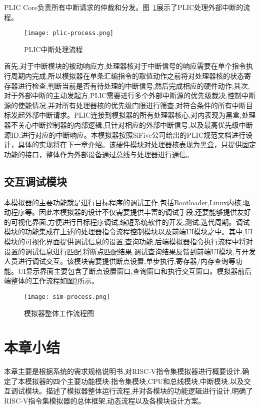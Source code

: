 PLIC Core负责所有中断请求的仲裁和分发。图~\ref{fig:plic-process}展示了PLIC处理外部中断的流程。
\begin{figure}[h]
    \centering
    \texttt{[image: plic-process.png]}
    \caption{PLIC中断处理流程}
    \label{fig:plic-process}
\end{figure}

首先,对于中断模块的被动响应方,处理器核对于中断信号的响应需要在单个指令执行周期内完成,所以模拟器在单条汇编指令的取值动作之前将对处理器核的状态寄存器进行检查,判断当前是否有待处理的中断信号,然后完成相应的硬件动作;其次,对于外部中断的主动发起方,PLIC需要进行多个外部中断源的优先级裁决,控制中断源的使能情况,并对所有处理器核的优先级门限进行筛查,对符合条件的所有中断目标发起外部中断请求。PLIC连接到模拟器的所有处理器核心,对内表现为黑盒,处理器不关心中断控制器的内部逻辑,只针对相应的外部中断信号,以及最高优先级中断源ID,进行对应的中断响应。本模拟器按照SiFive公司给出的PLIC规范文档进行设计，具体的实现将在下一章介绍。该硬件模块对处理器核表现为黑盒，只提供固定功能的接口，整体作为外部设备通过总线与处理器进行通信。

\subsection{交互调试模块}
本模拟器的主要功能就是进行目标程序的调试工作,包括Bootloader,Linux内核,驱动程序等。因此本模拟器的设计不仅需要提供丰富的调试手段,还要能够提供友好的可视化界面,方便进行目标程序调试,缩短系统软件的开发,测试,迭代周期。调试模块的功能集成在上述的处理器指令流程控制模块以及前端UI模块之中。其中,UI模块的可视化界面提供调试信息的设置,查询功能,后端模拟器指令执行流程中将对设置的调试信息进行匹配,将断点匹配结果,调试查询结果反馈到前端UI模块,与开发人员进行调试交互。该模块需要提供断点设置,单步执行,寄存器/内存查询等功能。UI显示界面主要包含了断点设置窗口,查询窗口和执行交互窗口。模拟器前后端整体的工作流程如图\ref{fig:work-frame}所示。
\begin{figure}[H]
  \centering
  \texttt{[image: sim-process.png]}
  \caption{模拟器整体工作流程图}
  \label{fig:work-frame}
\end{figure}

\section{本章小结}
本章主要是根据系统的需求规格说明书,对RISC-V指令集模拟器进行概要设计,确定了本模拟器的四个主要功能模块:指令集模块,CPU和总线模块,中断模块,以及交互调试模块。描述了模拟器整体运行流程,并对各模块的功能逻辑进行设计,明确了RISC-V指令集模拟器的总体框架,动态流程以及各模块设计方案。